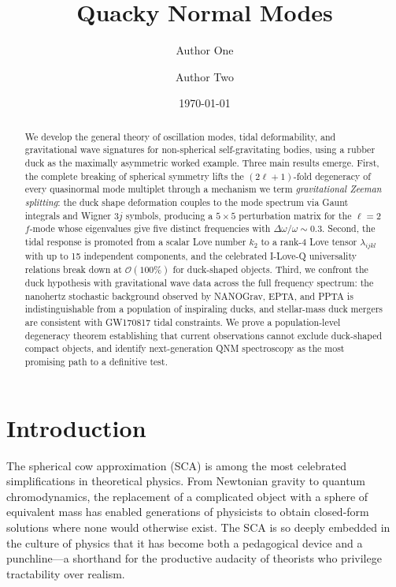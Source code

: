 \documentclass[aps,prd,twocolumn,superscriptaddress,nofootinbib]{revtex4-2}
\newcommand{\order}[1]{\mathcal{O}(#1)}
\begin{document}
\title{Quacky Normal Modes}

\author{Author One}
\author{Author Two}

\date{\today}

\begin{abstract}
We develop the general theory of oscillation modes, tidal deformability,
and gravitational wave signatures for non-spherical self-gravitating bodies,
using a rubber duck as the maximally asymmetric worked example.
Three main results emerge.
First, the complete breaking of spherical symmetry lifts the
$(2\ell+1)$-fold degeneracy of every quasinormal mode multiplet through a
mechanism we term \textit{gravitational Zeeman splitting}: the duck shape
deformation couples to the mode spectrum via Gaunt integrals and Wigner $3j$
symbols, producing a $5\times5$ perturbation matrix for the $\ell=2$
$f$-mode whose eigenvalues give five distinct frequencies with
$\Delta\omega/\omega\sim 0.3$.
Second, the tidal response is promoted from a scalar Love number $k_2$ to a
rank-4 Love tensor $\lambda_{ijkl}$ with up to 15 independent components,
and the celebrated I-Love-Q universality relations break down at
$\order{100\%}$ for duck-shaped objects.
Third, we confront the duck hypothesis with gravitational wave data across
the full frequency spectrum: the nanohertz stochastic background observed by
NANOGrav, EPTA, and PPTA is indistinguishable from a population of
inspiraling ducks, and stellar-mass duck mergers are consistent with
GW170817 tidal constraints.
We prove a population-level degeneracy theorem establishing that current
observations cannot exclude duck-shaped compact objects, and identify
next-generation QNM spectroscopy as the most promising path to a definitive
test.
\end{abstract}

\maketitle


\section{Introduction}
\label{sec:intro}

The spherical cow approximation (SCA) is among the most celebrated
simplifications in theoretical physics.
From Newtonian gravity to quantum chromodynamics, the replacement of a
complicated object with a sphere of equivalent mass has enabled generations
of physicists to obtain closed-form solutions where none would otherwise
exist.
The SCA is so deeply embedded in the culture of physics that it has become
both a pedagogical device and a punchline---a shorthand for the productive
audacity of theorists who privilege tractability over realism.
\end{document}
